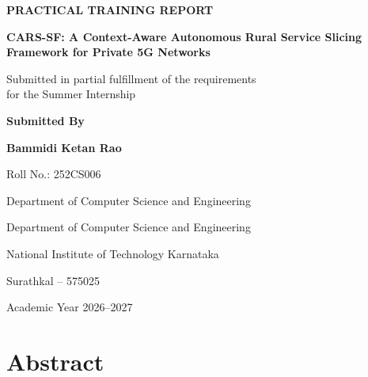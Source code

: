 \documentclass[12pt,a4paper]{report}
\begin{document}
	
	
	\begin{titlepage}
		
		\begin{center}
			
			\vspace*{1cm}
			
			{\Large \textbf{PRACTICAL TRAINING REPORT}}
			
			\vspace{1.2cm}
			
			{\Large
				\textbf{
					CARS-SF: A Context-Aware Autonomous Rural Service Slicing Framework
					for Private 5G Networks
				}
			}
			
			\vspace{2cm}
			
			Submitted in partial fulfillment of the requirements\\
			for the Summer Internship
			
			\vspace{1.5cm}
			
			\textbf{Submitted By}
			
			\vspace{0.4cm}
			
			\textbf{Bammidi Ketan Rao}
			
			Roll No.: 252CS006
			
			Department of Computer Science and Engineering
			
			\vspace{1.5cm}
			
			\vfill
			
			Department of Computer Science and Engineering
			
			National Institute of Technology Karnataka
			
			Surathkal -- 575025
			
			\vspace{0.6cm}
			
			Academic Year 2026--2027
			
		\end{center}
		
	\end{titlepage}
	
	
	
	\chapter*{Abstract}
	
\end{document}

